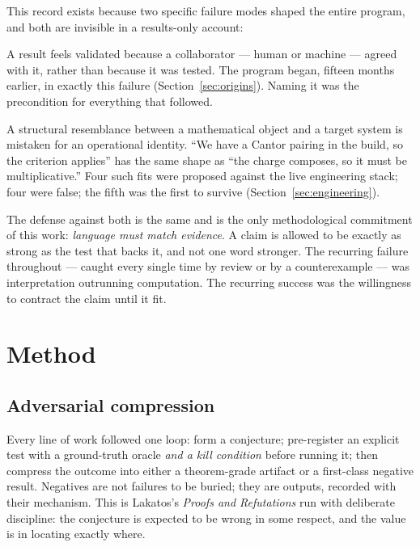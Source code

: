 \documentclass[11pt,a4paper]{article}
\theoremstyle{definition}
\theoremstyle{plain}
\begin{document}
This record exists because two specific failure modes shaped the entire program, and both are
invisible in a results-only account:

\begin{description}[leftmargin=1.4em]
\item[Sycophancy.] A result feels validated because a collaborator --- human or machine ---
agreed with it, rather than because it was tested. The program began, fifteen months earlier, in
exactly this failure (Section~\ref{sec:origins}). Naming it was the precondition for everything
that followed.
\item[False-fit.] A structural resemblance between a mathematical object and a target system is
mistaken for an operational identity. ``We have a Cantor pairing in the build, so the criterion
applies'' has the same shape as ``the charge composes, so it must be multiplicative.'' Four such
fits were proposed against the live engineering stack; four were false; the fifth was the first
to survive (Section~\ref{sec:engineering}).
\end{description}

The defense against both is the same and is the only methodological commitment of this work:
\emph{language must match evidence}. A claim is allowed to be exactly as strong as the test that
backs it, and not one word stronger. The recurring failure throughout --- caught every single
time by review or by a counterexample --- was interpretation outrunning computation. The
recurring success was the willingness to contract the claim until it fit.

\section{Method}\label{sec:method}

\subsection{Adversarial compression}
Every line of work followed one loop: form a conjecture; pre-register an explicit test with a
ground-truth oracle \emph{and a kill condition} before running it; then compress the outcome into
either a theorem-grade artifact or a first-class negative result. Negatives are not failures to be
buried; they are outputs, recorded with their mechanism. This is Lakatos's \emph{Proofs and
Refutations} run with deliberate discipline: the conjecture is expected to be wrong in some
respect, and the value is in locating exactly where.
\end{document}
